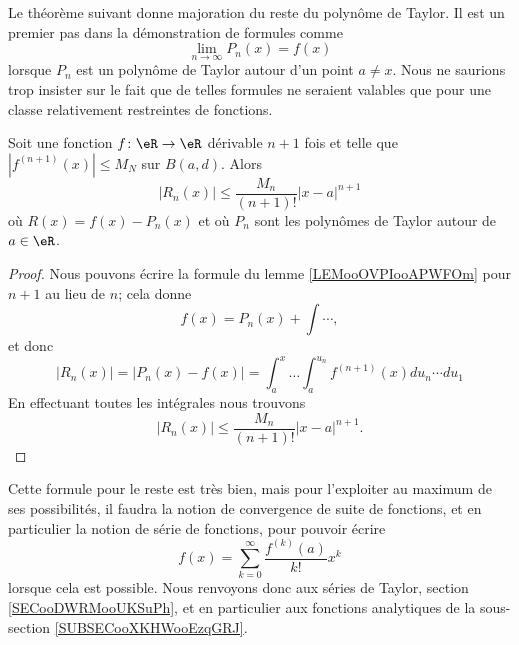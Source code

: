 Le théorème suivant donne majoration du reste du polynôme de Taylor. Il est un premier pas dans la démonstration de formules comme
\begin{equation}
    \lim_{n\to \infty} P_n(x)=f(x)
\end{equation}
lorsque \( P_n\) est un polynôme de Taylor autour d'un point \( a\neq x\). Nous ne saurions trop insister sur le fait que de telles formules ne seraient valables que pour une classe relativement restreintes de fonctions.
\begin{theorem}       \label{THOooEUVEooXZJTRL}
    Soit une fonction \( f\colon \eR\to \eR\) dérivable \( n+1\) fois et telle que \( | f^{(n+1)}(x) |\leq M_N\) sur \( B(a,d)\). Alors
    \begin{equation}
        | R_n(x) |\leq \frac{ M_n }{ (n+1)! }| x-a |^{n+1}
    \end{equation}
    où \( R(x)=f(x)-P_n(x)\) et où \( P_n\) sont les polynômes de Taylor autour de \( a\in \eR\).
\end{theorem}

\begin{proof}
    Nous pouvons écrire la formule du lemme \ref{LEMooOVPIooAPWFOm} pour \( n+1\) au lieu de \( n\); cela donne
    \begin{equation}
        f(x)=P_n(x)+\int\cdots,
    \end{equation}
    et donc
    \begin{equation}
        | R_n(x) |=| P_n(x)-f(x) |=\int_a^x\ldots\int_a^{u_n}f^{(n+1)}(x)du_n\cdots du_{1}
    \end{equation}
    En effectuant toutes les intégrales nous trouvons
    \begin{equation}
        | R_n(x) |\leq \frac{ M_n }{ (n+1)! }| x-a |^{n+1}.
    \end{equation}
\end{proof}
Cette formule pour le reste est très bien, mais pour l'exploiter au maximum de ses possibilités, il faudra la notion de convergence de suite de fonctions, et en particulier la notion de série de fonctions, pour pouvoir écrire 
\begin{equation}
    f(x)=\sum_{k=0}^{\infty}\frac{ f^{(k)}(a) }{ k! }x^k
\end{equation}
lorsque cela est possible. Nous renvoyons donc aux séries de Taylor, section \ref{SECooDWRMooUKSuPh}, et en particulier aux fonctions analytiques de la sous-section \ref{SUBSECooXKHWooEzqGRJ}.

